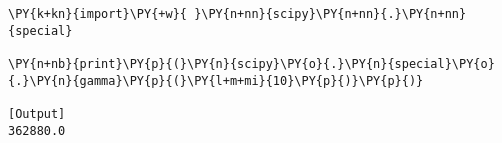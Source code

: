 \begin{Verbatim}[label=\makebox{\href{https://github.com/unipi-physics-labs/lab1-notes/tree/main/snippy/scipy.special.gamma.py}{https://github.com/.../scipy.special.gamma.py}},commandchars=\\\{\}]
\PY{k+kn}{import}\PY{+w}{ }\PY{n+nn}{scipy}\PY{n+nn}{.}\PY{n+nn}{special}

\PY{n+nb}{print}\PY{p}{(}\PY{n}{scipy}\PY{o}{.}\PY{n}{special}\PY{o}{.}\PY{n}{gamma}\PY{p}{(}\PY{l+m+mi}{10}\PY{p}{)}\PY{p}{)}

[Output]
362880.0
\end{Verbatim}
